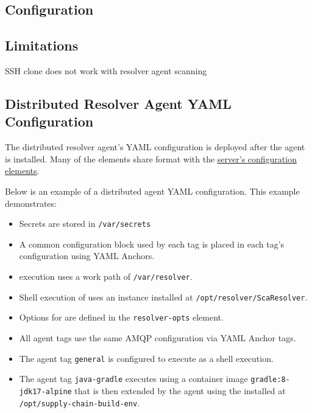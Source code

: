 \subsection{Configuration}

\subsection{Limitations}
SSH clone does not work with resolver agent scanning


\subsection{Distributed Resolver Agent YAML Configuration}

The distributed resolver agent's YAML configuration is deployed after the agent is installed.
Many of the elements share format with the \hyperref[sec:yaml-config]{server's configuration elements}. 


Below is an example of a distributed agent YAML configuration.  This example demonstrates:

\begin{itemize}
  \item Secrets are stored in \texttt{/var/secrets}
  \item A common configuration block used by each tag is placed in each tag's configuration using YAML Anchors.
  \item \scaresolver execution uses a work path of \texttt{/var/resolver}.
  \item Shell execution of \scaresolver uses an instance installed at \texttt{/opt/resolver/ScaResolver}.
  \item Options for \scaresolver are defined in the \texttt{resolver-opts} element.
  \item All agent tags use the same AMQP configuration via YAML Anchor tags.
  \item The agent tag \texttt{general} is configured to execute \scaresolver as a shell execution.
  \item The agent tag \texttt{java-gradle} executes \scaresolver using a container image \texttt{gradle:8-jdk17-alpine} that
    is then extended by the agent using the \toolkit installed at\\\texttt{/opt/supply-chain-build-env}.
\end{itemize}




\pagebreak

